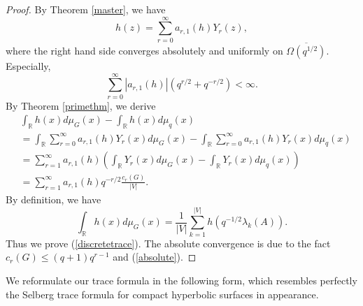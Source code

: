 \documentclass{article}
\begin{document}
\begin{proof}
By Theorem \ref{master}, we have
$$h(z)=\sum_{r=0}^{\infty}a_{r,1}(h)Y_r(z),$$
where the right hand side converges absolutely and uniformly on $\overline{\Omega(q^{1/2})}$. Especially, 
\begin{equation}\label{absolute}
    \sum_{r=0}^{\infty}|a_{r,1}(h)|(q^{r/2}+q^{-r/2})<\infty.
\end{equation}
By Theorem \ref{primethm}, we derive
$$
\begin{aligned}
&\int_{\mathbb{R}} h(x)d\mu_G(x)-\int_{\mathbb{R}} h(x)d\mu_q(x)\\
&=\int_{\mathbb{R}} \sum_{r=0}^{\infty}a_{r,1}(h)Y_r(x) d\mu_G(x)-\int_{\mathbb{R}} \sum_{r=0}^{\infty}a_{r,1}(h)Y_r(x) d\mu_q(x)\\
&=\sum_{r=1}^{\infty}a_{r,1}(h) \left(
\int_{\mathbb{R}} Y_r(x) d\mu_G(x)-\int_{\mathbb{R}} Y_r(x) d\mu_q(x)
\right)\\
&=\sum_{r=1}^{\infty}a_{r,1}(h) q^{-r/2}\frac{c_r(G)}{|V|}.
\end{aligned}
$$
By definition, we have
$$\int_{\mathbb{R}} h(x)d\mu_G(x)=\frac{1}{|V|}\sum_{k=1}^{|V|} h(q^{-1/2}\lambda_k(A)).$$ Thus we prove (\ref{discretetrace}). The absolute convergence is due to the fact $c_r(G)\leq (q+1)q^{r-1}$ and (\ref{absolute}).
\end{proof}

We reformulate our trace formula in the following form, which resembles perfectly the Selberg trace formula for compact hyperbolic surfaces in appearance. 
\end{document}
